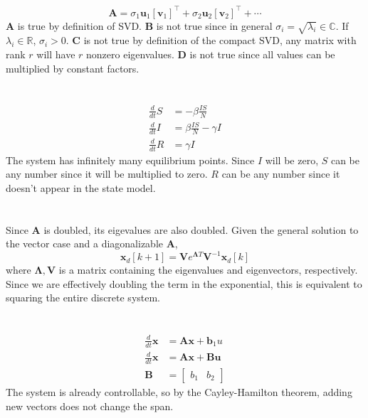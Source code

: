 \documentclass[]{article}
\newcommand{\tpose}[1]{\left[#1\right]^{\! \top} \!\!}
\newcommand{\diff}[1]{\frac{d}{d #1}}
\begin{document}
\section{}

\begin{equation}
	\bm{A} = \sigma_1 \bm{u}_1 \tpose{\bm{v}_1} + \sigma_2 \bm{u}_2 \tpose{\bm{v}_2} + \cdots
\end{equation}
\textbf{A} is true by definition of SVD.
\textbf{B} is not true since in general \(\sigma_i = \sqrt{\lambda_i} \in \mathbb{C}\).
If \(\lambda_i \in \mathbb{R}\), \(\sigma_i > 0\).
\textbf{C} is not true by definition of the compact SVD, any matrix with rank \(r\) will have \(r\) nonzero eigenvalues.
\textbf{D} is not true since all values can be multiplied by constant factors.

\section{}

\begin{align}
	\diff{t}S &= -\beta \frac{IS}{N} \\
	\diff{t}I &= \beta \frac{IS}{N} - \gamma I \\
	\diff{t}R &= \gamma I
\end{align}
The system has infinitely many equilibrium points.
Since \(I\) will be zero, \(S\) can be any number since it will be multiplied to zero.
\(R\) can be any number since it doesn't appear in the state model.

\section{}

Since \(\bm{A}\) is doubled, its eigevalues are also doubled.
Given the general solution to the vector case and a diagonalizable \(\bm{A}\),
\begin{equation}
	\bm{x}_d[k + 1] = \bm{V} e^{\bm{\Lambda}T} \bm{V}^{-1} \bm{x}_d[k]
\end{equation}
where \(\bm{\Lambda}, \bm{V}\) is a matrix containing the eigenvalues and eigenvectors, respectively.
Since we are effectively doubling the term in the exponential, this is equivalent to squaring the entire discrete system.

\section{}

\begin{align}
	\diff{t} \bm{x} &= \bm{Ax} + \bm{b}_1 u \\
	\diff{t} \bm{x} &= \bm{Ax} + \bm{Bu} \\
	\bm{B} &=
	\begin{bmatrix}
	b_1 & b_2
	\end{bmatrix}
\end{align}
The system is already controllable, so by the Cayley-Hamilton theorem, adding new vectors does not change the span.
\end{document}
